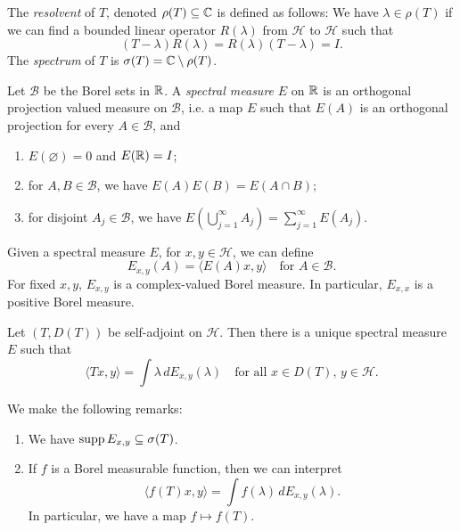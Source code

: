 \begin{definition}
  The \emph{resolvent} of $T$, denoted $\rho(T) \subseteq \mathbb{C}$
  is defined as follows: We
  have $\lambda \in \rho(T)$ if we can find a bounded
  linear operator $R(\lambda)$ from $\mathcal{H}$ to
  $\mathcal{H}$ such that
  \[
    (T - \lambda) R(\lambda) = R(\lambda)(T - \lambda) = I.
  \]
  The \emph{spectrum} of $T$ is $\sigma(T) = \mathbb{C} \setminus \rho(T)$.
\end{definition}

\begin{definition}
  Let $\mathcal{B}$ be the Borel sets in $\mathbb{R}$.
  A \emph{spectral measure} $E$ on $\mathbb{R}$ is an orthogonal
  projection valued measure on $\mathcal{B}$, i.e.
  a map $E$ such that $E(A)$ is an orthogonal projection
  for every $A \in \mathcal{B}$, and
  \begin{enumerate}
    \item $E(\varnothing) = 0$ and $E(\mathbb{R}) = I$;
    \item for $A, B \in \mathcal{B}$, we have
      $E(A) E(B) = E(A \cap B)$;
    \item for disjoint $A_j \in \mathcal{B}$, we have
      $E(\bigcup_{j = 1}^\infty A_j) = \sum_{j = 1}^\infty E(A_j)$.
  \end{enumerate}
\end{definition}

\begin{remark}
  Given a spectral measure $E$, for $x, y \in \mathcal{H}$,
  we can define
  \[
    E_{x, y}(A) = \langle E(A) x, y \rangle \quad
    \text{for $A \in \mathcal{B}$}.
  \]
  For fixed $x, y$,
  $E_{x, y}$ is a complex-valued Borel measure. In particular,
  $E_{x, x}$ is a positive Borel measure.
\end{remark}

\begin{theorem}
  Let $(T, D(T))$ be self-adjoint on $\mathcal{H}$. Then
  there is a unique spectral measure $E$ such that
  \[
    \langle Tx, y \rangle
    = \int \lambda \, dE_{x, y}(\lambda)
    \quad \text{for all $x \in D(T)$, $y \in \mathcal{H}$}.
  \]
\end{theorem}

\begin{remark}
  We make the following remarks:
  \begin{enumerate}
    \item We have $\operatorname{supp} E_{x, y} \subseteq \sigma(T)$.
    \item If $f$ is a Borel measurable function, then
      we can interpret
      \[
        \langle f(T) x, y \rangle
        = \int f(\lambda) \, dE_{x, y}(\lambda).
      \]
      In particular, we have a map
      $f \mapsto f(T)$.
  \end{enumerate}
\end{remark}
